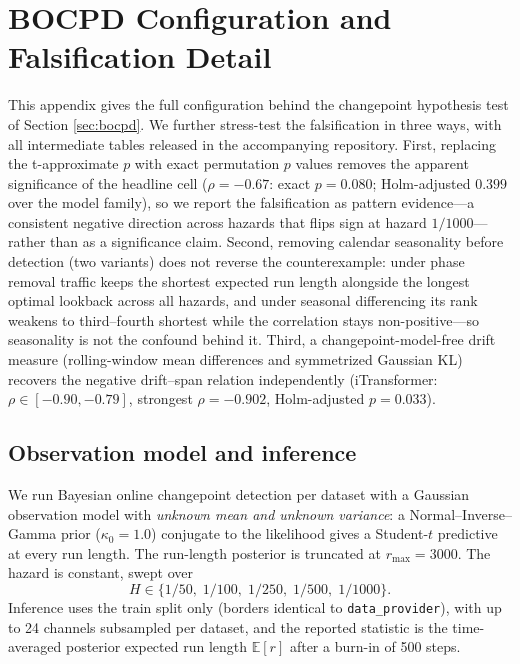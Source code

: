 \section{BOCPD Configuration and Falsification Detail}
\label{app:bocpd}

This appendix gives the full configuration behind the changepoint hypothesis test of Section \ref{sec:bocpd}. We further stress-test the falsification in three ways, with all intermediate tables released in the accompanying repository. First, replacing the t-approximate $p$ with exact permutation $p$ values removes the apparent significance of the headline cell ($\rho=-0.67$: exact $p=0.080$; Holm-adjusted $0.399$ over the model family), so we report the falsification as pattern evidence---a consistent negative direction across hazards that flips sign at hazard $1/1000$---rather than as a significance claim. Second, removing calendar seasonality before detection (two variants) does not reverse the counterexample: under phase removal traffic keeps the shortest expected run length alongside the longest optimal lookback across all hazards, and under seasonal differencing its rank weakens to third--fourth shortest while the correlation stays non-positive---so seasonality is not the confound behind it. Third, a changepoint-model-free drift measure (rolling-window mean differences and symmetrized Gaussian KL) recovers the negative drift--span relation independently (iTransformer: $\rho \in [-0.90, -0.79]$, strongest $\rho=-0.902$, Holm-adjusted $p=0.033$).

\subsection{Observation model and inference}

We run Bayesian online changepoint detection \citep{bocpd} per dataset with a Gaussian observation model with \emph{unknown mean and unknown variance}: a Normal--Inverse--Gamma prior ($\kappa_0 = 1.0$) conjugate to the likelihood gives a Student-$t$ predictive at every run length. The run-length posterior is truncated at $r_{\max} = 3000$. The hazard is constant, swept over
\begin{equation}
H \in \{1/50,\; 1/100,\; 1/250,\; 1/500,\; 1/1000\}.
\end{equation}
Inference uses the train split only (borders identical to \texttt{data\_provider}), with up to 24 channels subsampled per dataset, and the reported statistic is the time-averaged posterior expected run length $\mathbb{E}[r]$ after a burn-in of 500 steps.

